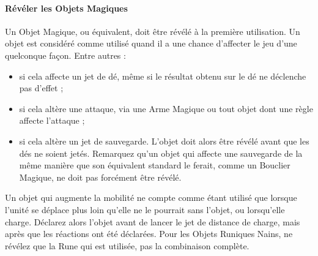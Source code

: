 \paragraph{Révéler les Objets Magiques}

Un Objet Magique, ou équivalent, doit être révélé à la première utilisation. Un objet est considéré comme utilisé quand il a une chance d'affecter le jeu d'une quelconque façon. Entre autres :
\begin{itemize}[label={-}]
\item si cela affecte un jet de dé, même si le résultat obtenu sur le dé ne déclenche pas d'effet ;
\item si cela altère une attaque, via une Arme Magique ou tout objet dont une règle affecte l'attaque ;
\item si cela altère un jet de sauvegarde. L'objet doit alors être révélé avant que les dés ne soient jetés. Remarquez qu'un objet qui affecte une sauvegarde de la même manière que son équivalent standard le ferait, comme un Bouclier Magique, ne doit pas forcément être révélé.
\end{itemize}

Un objet qui augmente la mobilité ne compte comme étant utilisé que lorsque l'unité se déplace plus loin qu'elle ne le pourrait sans l'objet, ou lorsqu'elle charge. Déclarez alors l'objet avant de lancer le jet de distance de charge, mais après que les réactions ont été déclarées. Pour les Objets Runiques Nains, ne révélez que la Rune qui est utilisée, pas la combinaison complète.

